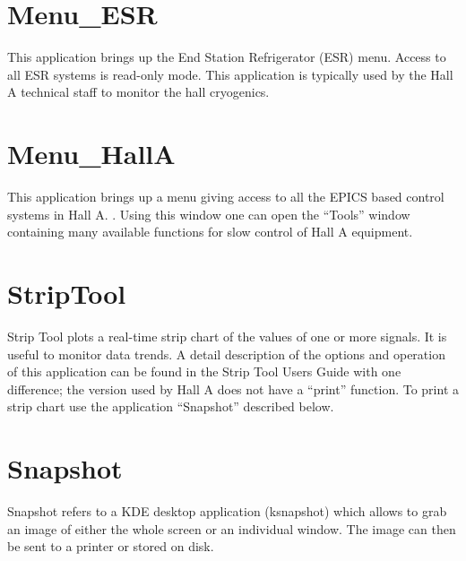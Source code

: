 {\section{Menu\_ESR}
This application brings up the End Station
Refrigerator (ESR) menu. Access to all ESR systems is read-only mode. This application
is typically used by the Hall A technical staff to
monitor the hall cryogenics.


\section{Menu\_HallA}
\label{sec:contr-ha-menu}
This application brings up a menu giving access to all the EPICS 
based control systems in Hall A.
.
Using this window one can open the ``Tools'' window%
 containing
many available functions for slow control of Hall A equipment.

\section{StripTool}
Strip Tool plots a real-time strip chart of the values of one or more signals.
It is useful to monitor data trends.
A detail description of the options and operation
of this application can be found in the Strip Tool Users
Guide
with one difference; the version used by Hall A does not have a ``print'' function.
To print a strip chart use the application ``Snapshot'' described below.

\section{Snapshot}
Snapshot refers to a KDE desktop application (ksnapshot) which allows to grab an image
of either the whole
screen or an individual window. The image can then be sent to a printer or stored on disk.

}
